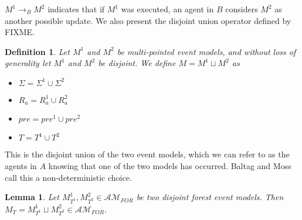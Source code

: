 \documentclass[12pt, a4paper, titlepage]{scrartcl}
\newtheorem{defn}{Definition}[section]
\newtheorem{lemma}{Lemma}[section]
\numberwithin{equation}{section}
\newcommand{\eventClass}{\mathcal{AM}}
\newcommand{\forestClass}{\eventClass_{FOR}}
\begin{document}
$M^1 \to_B M^2$ indicates that if $M^1$ was executed, an agent in $B$ considers $M^2$ as another
possible update.
We also present the disjoint union operator defined by FIXME.


\begin{defn} \label{disjoint}
Let $M^1$ and $M^2$ be multi-pointed event models, and without loss of generality let $M^1$ and
$M^2$ be disjoint.
We define $M = M^1 \sqcup M^2$ as
\begin{itemize}
	\item $\Sigma = \Sigma^1 \cup \Sigma^2$
	\item $R_a = R^1_a \cup R^2_a$
	\item $pre = pre^1 \cup pre^2$
	\item $T = T^1 \cup T^2$
\end{itemize}
\end{defn}
This is the disjoint union of the two event models, which we can refer to as the agents in $A$
knowing that one of the two models has occurred.
Baltag and Moss call this a non-deterministic choice.

\begin{lemma} \label{disjForestIsForest}
Let $M^1_{T^1}, M^2_{T^2} \in \forestClass$ be two disjoint forest event models.
Then $M_T = M^1_{T^1} \sqcup M^2_{T^2} \in \forestClass$.
\end{lemma}
\end{document}
